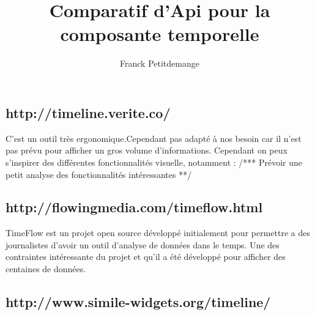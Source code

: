 \documentclass[10pt,a4paper]{article}
\author{Franck Petitdemange}
\title{Comparatif d'Api pour la composante temporelle}
\begin{document}
\subsection*{http://timeline.verite.co/}
C'est un outil très ergonomique.Cependant pas adapté à nos besoin car il n'est pas prévu pour afficher un gros volume d'informations. Cependant on peux s'inspirer des différentes fonctionnalités visuelle, notamment : 
/*** Prévoir une petit analyse des fonctionnalités intéressantes **/

\subsection*{http://flowingmedia.com/timeflow.html}
TimeFlow est un projet open source développé initialement pour permettre a des journalistes d'avoir un outil d'analyse de données dans le temps. Une des contraintes intéressante du projet et qu'il a été développé pour afficher des centaines de données.

\subsection{http://www.simile-widgets.org/timeline/}
\end{document}
